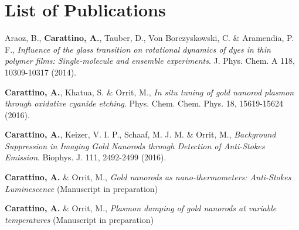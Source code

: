\chapter*{List of Publications}
\label{publications}

\begin{etaremune}{\small

\item Araoz, B., \textbf{Carattino, A.}, Tauber, D., Von Borczyskowski, C. \&
Aramendia, P. F., \textit{Influence of the glass transition on rotational
dynamics of dyes in thin polymer films: Single-molecule and ensemble
experiments}. J. Phys. Chem. A 118, 10309-10317 (2014).
\item \textbf{Carattino, A.}, Khatua, S. \& Orrit, M., \textit{In situ tuning of
gold nanorod plasmon through oxidative cyanide etching}. Phys. Chem. Chem. Phys.
18, 15619-15624 (2016).
\item \textbf{Carattino, A.}, Keizer, V. I. P., Schaaf, M. J. M. \& Orrit, M.,
\textit{Background Suppression in Imaging Gold Nanorods through Detection of
Anti-Stokes Emission}. Biophys. J. 111, 2492-2499 (2016).
\item \textbf{Carattino, A.} \& Orrit, M., \textit{Gold nanorods as
nano-thermometers: Anti-Stokes Luminescence} (Manuscript in preparation)
\item \textbf{Carattino, A.} \& Orrit, M., \textit{Plasmon damping of gold
nanorods at variable temperatures} (Manuscript in preparation)

}\end{etaremune}

